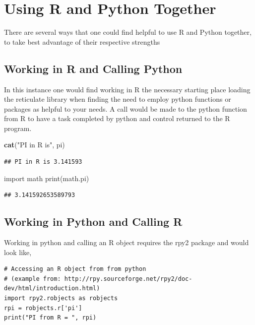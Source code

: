 \documentclass[]{book}
\newenvironment{Shaded}{\begin{snugshade}}{\end{snugshade}}
\newcommand{\KeywordTok}[1]{\textcolor[rgb]{0.13,0.29,0.53}{\textbf{#1}}}
\newcommand{\StringTok}[1]{\textcolor[rgb]{0.31,0.60,0.02}{#1}}
\newcommand{\ImportTok}[1]{#1}
\newcommand{\BuiltInTok}[1]{#1}
\newcommand{\NormalTok}[1]{#1}
\theoremstyle{definition}
\theoremstyle{definition}
\theoremstyle{definition}
\theoremstyle{remark}
\begin{document}
\section{Using R and Python Together}\label{using-r-and-python-together}

There are several ways that one could find helpful to use R and Python
together, to take best advantage of their respective strengths

\subsection{Working in R and Calling
Python}\label{working-in-r-and-calling-python}

In this instance one would find working in R the necessary starting
place loading the reticulate  library when finding the
need to employ python functions or packages as helpful to your needs. A
call would be made to the python function from R to have a task
completed by python and control returned to the R program.

\begin{Shaded}
\begin{Highlighting}[]
\KeywordTok{cat}\NormalTok{(}\StringTok{"PI in R is"}\NormalTok{, pi)}
\end{Highlighting}
\end{Shaded}

\begin{verbatim}
## PI in R is 3.141593
\end{verbatim}

\begin{Shaded}
\begin{Highlighting}[]
\ImportTok{import}\NormalTok{ math}
\BuiltInTok{print}\NormalTok{(math.pi)}
\end{Highlighting}
\end{Shaded}

\begin{verbatim}
## 3.141592653589793
\end{verbatim}

\subsection{Working in Python and Calling
R}\label{working-in-python-and-calling-r}

Working in python and calling an R object requires the rpy2 
package and would look like,

\begin{verbatim}
# Accessing an R object from from python 
# (example from: http://rpy.sourceforge.net/rpy2/doc-dev/html/introduction.html)
import rpy2.robjects as robjects
rpi = robjects.r['pi']
print("PI from R = ", rpi)
\end{verbatim}
\end{document}
